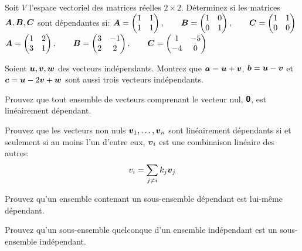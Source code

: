 \begin{exerciceC}
Soit $V$ l'espace vectoriel des matrices réelles $2\times2$. Déterminez si les matrices $\boldsymbol{A}, \boldsymbol{B}, \boldsymbol{C}$ sont dépendantes si:
  $\displaystyle
 \boldsymbol{A} = \begin{pmatrix}
 1 & 1 \\
 1 & 1
 \end{pmatrix},
 \qquad
 \boldsymbol{B} = \begin{pmatrix}
 1 & 0 \\
 0 & 1
 \end{pmatrix}, \qquad
 \boldsymbol{C} = \begin{pmatrix}
 1 & 1 \\
 0 & 0
 \end{pmatrix}
 $
   $\displaystyle
 \boldsymbol{A} = \begin{pmatrix}
 1 & 2 \\
 3 & 1
 \end{pmatrix},
 \qquad
 \boldsymbol{B} = \begin{pmatrix}
 3 & -1 \\
 2 & 2
 \end{pmatrix}, \qquad
 \boldsymbol{C} = \begin{pmatrix}
 1 & -5 \\
 -4 & 0
 \end{pmatrix}
 $
\end{exerciceC}
\begin{exerciceC}
Soient $\boldsymbol{u}, \boldsymbol{v}, \boldsymbol{w}$ des vecteurs indépendants. Montrez que
$\boldsymbol{a}=\boldsymbol{u}+\boldsymbol{v}$, $\boldsymbol{b} = \boldsymbol{u}-\boldsymbol{v}$ et $\boldsymbol{c} = \boldsymbol{u} - 2\boldsymbol{v} + \boldsymbol{w}$
sont aussi trois vecteurs indépendants.
\end{exerciceC}
\begin{exerciceC}
Prouvez que tout ensemble de vecteurs comprenant le vecteur nul, $\mbox{\textsf{\textbf{{0}}}}$, est linéairement dépendant.
\end{exerciceC}
\begin{exerciceC}
Prouvez que les vecteurs non nuls $\boldsymbol{v}_1, \ldots, \boldsymbol{v}_n$ sont linéairement dépendants si et seulement si
au moins l'un d'entre eux, $\boldsymbol{v}_i$ est une combinaison linéaire des autres:
\[
v_i = \sum_{j\neq i} k_j \boldsymbol{v}_j
\]
\end{exerciceC}
\begin{exerciceC}
Prouvez qu'un ensemble contenant un sous-ensemble dépendant est lui-même dépendant.
\end{exerciceC}
\begin{exerciceC}
Prouvez qu'un sous-ensemble quelconque d'un ensemble indépendant est un sous-ensemble indépendant.
\end{exerciceC}



